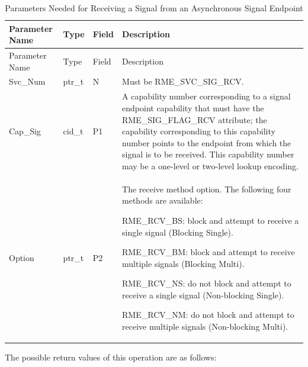 \begin{xltabular}{\textwidth}{@{}>{\hsize\raggedright\arraybackslash}X>{\hsize\raggedright\arraybackslash}X>{\hsize\raggedright\arraybackslash}X>{\hsize\raggedright\arraybackslash}X@{}}
\caption{Parameters Needed for Receiving a Signal from an Asynchronous Signal Endpoint}\label{tab:5-22-receive-signal-parameters}\\
\toprule
Parameter Name & Type & Field & Description\tabularnewline
\endfirsthead
\toprule
Parameter Name & Type & Field & Description\tabularnewline
\midrule
\endhead
\bottomrule
\endlastfoot
Svc\_Num & ptr\_t & N & Must be RME\_SVC\_SIG\_RCV.\tabularnewline
Cap\_Sig & cid\_t & P1 &
A capability number corresponding to a signal endpoint capability that must have the RME\_SIG\_FLAG\_RCV attribute; the capability corresponding to this capability number points to the endpoint from which the signal is to be received. This capability number may be a one-level or two-level lookup encoding.\tabularnewline
Option\strut
 & ptr\_t\strut
 & P2\strut
 & The receive method option. The following four methods are available:

RME\_RCV\_BS: block and attempt to receive a single signal (Blocking Single).

RME\_RCV\_BM: block and attempt to receive multiple signals (Blocking Multi).

RME\_RCV\_NS: do not block and attempt to receive a single signal (Non-blocking Single).

RME\_RCV\_NM: do not block and attempt to receive multiple signals (Non-blocking Multi).\strut
\tabularnewline
\end{xltabular}
\nopagebreak[4]

The possible return values of this operation are as follows:

